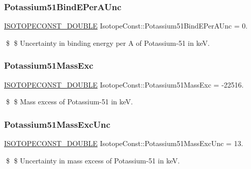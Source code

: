 \subsubsection{\texorpdfstring{Potassium51\+Bind\+E\+Per\+A\+Unc}{Potassium51BindEPerAUnc}}
{\footnotesize\ttfamily \mbox{\hyperlink{group___isotope_const-_macros_ga8f45a7272ce02c0b4c65c44636ed719a}{I\+S\+O\+T\+O\+P\+E\+C\+O\+N\+S\+T\+\_\+\+D\+O\+U\+B\+LE}} Isotope\+Const\+::\+Potassium51\+Bind\+E\+Per\+A\+Unc = 0.}

\$ \$ Uncertainty in binding energy per A of Potassium-\/51 in keV. \mbox{\label{group___isotope_const-_potassium-_k51_ga3fae2e24aa4cd406070d7e962e882285}} 
\subsubsection{\texorpdfstring{Potassium51\+Mass\+Exc}{Potassium51MassExc}}
{\footnotesize\ttfamily \mbox{\hyperlink{group___isotope_const-_macros_ga8f45a7272ce02c0b4c65c44636ed719a}{I\+S\+O\+T\+O\+P\+E\+C\+O\+N\+S\+T\+\_\+\+D\+O\+U\+B\+LE}} Isotope\+Const\+::\+Potassium51\+Mass\+Exc = -\/22516.}

\$ \$ Mass excess of Potassium-\/51 in keV. \mbox{\label{group___isotope_const-_potassium-_k51_ga8c5704e1a212a7f5d3359a2ca367c016}} 
\subsubsection{\texorpdfstring{Potassium51\+Mass\+Exc\+Unc}{Potassium51MassExcUnc}}
{\footnotesize\ttfamily \mbox{\hyperlink{group___isotope_const-_macros_ga8f45a7272ce02c0b4c65c44636ed719a}{I\+S\+O\+T\+O\+P\+E\+C\+O\+N\+S\+T\+\_\+\+D\+O\+U\+B\+LE}} Isotope\+Const\+::\+Potassium51\+Mass\+Exc\+Unc = 13.}

\$ \$ Uncertainty in mass excess of Potassium-\/51 in keV. \mbox{\label{group___isotope_const-_potassium-_k51_gaeeb37c90d61127c5e7b983025bf3062f}} 
